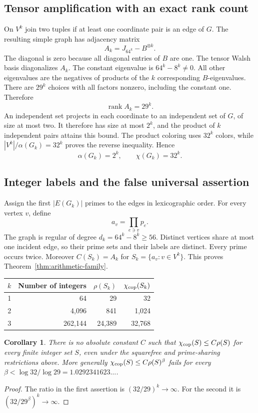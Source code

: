 \documentclass[11pt,a4paper]{article}
\newtheorem{corollary}[theorem]{Corollary}
\theoremstyle{definition}
\theoremstyle{remark}
\DeclareMathOperator{\rank}{rank}
\newcommand{\cchi}{\chi_{\rm cop}}
\numberwithin{equation}{section}
\begin{document}
\subsection{Tensor amplification with an exact rank count}

On $V^k$ join two tuples if at least one coordinate pair is an edge
of $G$. The resulting simple graph has adjacency matrix
\[
A_k=J_{64^k}-B^{\otimes k}.
\]
The diagonal is zero because all diagonal entries of $B$ are one.
The tensor Walsh basis diagonalizes $A_k$. The constant eigenvalue is
$64^k-8^k\ne0$. All other eigenvalues are the negatives of products of
the $k$ corresponding $B$-eigenvalues. There are $29^k$ choices with
all factors nonzero, including the constant one. Therefore
\[
\rank A_k=29^k.
\]
An independent set projects in each coordinate to an independent set
of $G$, of size at most two. It therefore has size at most $2^k$,
and the product of $k$ independent pairs attains this bound.
The product coloring uses $32^k$ colors, while
$|V^k|/\alpha(G_k)=32^k$ proves the reverse inequality. Hence
\[
\alpha(G_k)=2^k,\qquad\chi(G_k)=32^k.
\]

\subsection{Integer labels and the false universal assertion}

Assign the first $|E(G_k)|$ primes to the edges in lexicographic order.
For every vertex $v$, define
\[
a_v=\prod_{e\ni v}p_e.
\]
The graph is regular of degree $d_k=64^k-8^k\ge56$. Distinct vertices
share at most one incident edge, so their prime sets and their labels
are distinct. Every prime occurs twice. Moreover $C(S_k)=A_k$ for
$S_k=\{a_v:v\in V^k\}$. This proves
Theorem~\ref{thm:arithmetic-family}.

\begin{center}
\begin{tabular}{@{}rrrr@{}}
\toprule
$k$ & Number of integers & $\rho(S_k)$ & $\cchi(S_k)$\\
\midrule
1&64&29&32\\
2&4,096&841&1,024\\
3&262,144&24,389&32,768\\
\bottomrule
\end{tabular}
\end{center}

\begin{corollary}
There is no absolute constant $C$ such that
$\cchi(S)\le C\rho(S)$ for every finite integer set $S$, even under
the squarefree and prime-sharing restrictions above.
More generally $\cchi(S)\le C\rho(S)^\beta$ fails for every
$\beta<\log32/\log29=1.0292341623\ldots$.
\end{corollary}
\begin{proof}
The ratio in the first assertion is $(32/29)^k\to\infty$.
For the second it is $(32/29^\beta)^k\to\infty$.
\end{proof}
\end{document}
